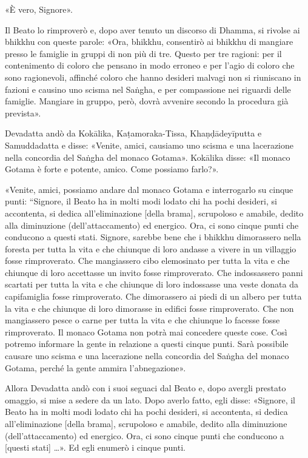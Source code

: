«È vero, Signore».


Il Beato lo rimproverò e, dopo aver tenuto un discorso di Dhamma, si
rivolse ai bhikkhu con queste parole: «Ora, bhikkhu, consentirò ai
bhikkhu di mangiare presso le famiglie in gruppi di non più di tre.
Questo per tre ragioni: per il contenimento di coloro che pensano in
modo erroneo e per l’agio di coloro che sono ragionevoli, affinché
coloro che hanno desideri malvagi non si riuniscano in fazioni e causino
uno scisma nel Saṅgha, e per compassione nei riguardi delle famiglie.
Mangiare in gruppo, però, dovrà avvenire secondo la procedura già
prevista».




Devadatta andò da Kokālika, Kaṭamoraka-Tissa, Khaṇḍādeyīputta e
Samuddadatta e disse: «Venite, amici, causiamo uno scisma e una
lacerazione nella concordia del Saṅgha del monaco Gotama». Kokālika
disse: «Il monaco Gotama è forte e potente, amico. Come possiamo
farlo?».


«Venite, amici, possiamo andare dal monaco Gotama e interrogarlo su
cinque punti: “Signore, il Beato ha in molti modi lodato chi ha pochi
desideri, si accontenta, si dedica all’eliminazione [della brama],
scrupoloso e amabile, dedito alla diminuzione (dell’attaccamento) ed
energico. Ora, ci sono cinque punti che conducono a questi stati.
Signore, sarebbe bene che i bhikkhu dimorassero nella foresta per tutta
la vita e che chiunque di loro andasse a vivere in un villaggio fosse
rimproverato. Che mangiassero cibo elemosinato per tutta la vita e che
chiunque di loro accettasse un invito fosse rimproverato. Che
indossassero panni scartati per tutta la vita e che chiunque di loro
indossasse una veste donata da capifamiglia fosse rimproverato. Che
dimorassero ai piedi di un albero per tutta la vita e che chiunque di
loro dimorasse in edifici fosse rimproverato. Che non mangiassero pesce
o carne per tutta la vita e che chiunque lo facesse fosse rimproverato.
Il monaco Gotama non potrà mai concedere queste cose. Così potremo
informare la gente in relazione a questi cinque punti. Sarà possibile
causare uno scisma e una lacerazione nella concordia del Saṅgha del
monaco Gotama, perché la gente ammira l’abnegazione».


Allora Devadatta andò con i suoi seguaci dal Beato e, dopo avergli
prestato omaggio, si mise a sedere da un lato. Dopo averlo fatto, egli
disse: «Signore, il Beato ha in molti modi lodato chi ha pochi desideri,
si accontenta, si dedica all’eliminazione [della brama], scrupoloso e
amabile, dedito alla diminuzione (dell’attaccamento) ed energico. Ora,
ci sono cinque punti che conducono a [questi stati] …​». Ed egli
enumerò i cinque punti.


